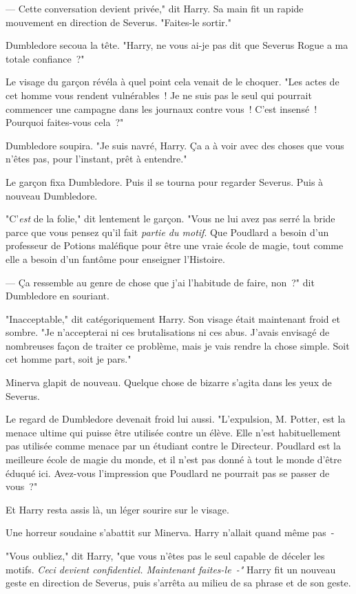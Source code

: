 --- Cette conversation devient privée," dit Harry. Sa main fit un rapide mouvement en direction de Severus. "Faites-le sortir."

Dumbledore secoua la tête. "Harry, ne vous ai-je pas dit que Severus Rogue a ma totale confiance~?"

Le visage du garçon révéla à quel point cela venait de le choquer. "Les actes de cet homme vous rendent vulnérables~! Je ne suis pas le seul qui pourrait commencer une campagne dans les journaux contre vous~! C'est insensé~! Pourquoi faites-vous cela~?"

Dumbledore soupira. "Je suis navré, Harry. Ça a à voir avec des choses que vous n'êtes pas, pour l'instant, prêt à entendre."

Le garçon fixa Dumbledore. Puis il se tourna pour regarder Severus. Puis à nouveau Dumbledore.

"C'\emph{est} de la folie," dit lentement le garçon. "Vous ne lui avez pas serré la bride parce que vous pensez qu'il fait \emph{partie du motif}. Que Poudlard a besoin d'un professeur de Potions maléfique pour être une vraie école de magie, tout comme elle a besoin d'un fantôme pour enseigner l'Histoire.

--- Ça ressemble au genre de chose que j'ai l'habitude de faire, non~?" dit Dumbledore en souriant.

"Inacceptable," dit catégoriquement Harry. Son visage était maintenant froid et sombre. "Je n'accepterai ni ces brutalisations ni ces abus. J'avais envisagé de nombreuses façon de traiter ce problème, mais je vais rendre la chose simple. Soit cet homme part, soit je pars."

Minerva glapit de nouveau. Quelque chose de bizarre s'agita dans les yeux de Severus.

Le regard de Dumbledore devenait froid lui aussi. "L'expulsion, M. Potter, est la menace ultime qui puisse être utilisée contre un élève. Elle n'est habituellement pas utilisée comme menace par un étudiant contre le Directeur. Poudlard est la meilleure école de magie du monde, et il n'est pas donné à tout le monde d'être éduqué ici. Avez-vous l'impression que Poudlard ne pourrait pas se passer de vous~?"

Et Harry resta assis là, un léger sourire sur le visage.

Une horreur soudaine s'abattit sur Minerva. Harry n'allait quand même pas~-

"Vous oubliez," dit Harry, "que vous n'êtes pas le seul capable de déceler les motifs. \emph{Ceci devient confidentiel. Maintenant faites-le~-"} Harry fit un nouveau geste en direction de Severus, puis s'arrêta au milieu de sa phrase et de son geste.

